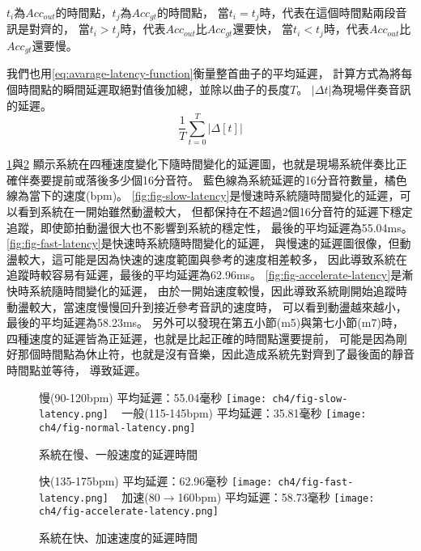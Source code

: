 \documentclass[class=NCU_thesis, crop=false]{standalone}
\begin{document}
$t_i$為$Acc_{out}$的時間點，$t_j$為$Acc_{gt}$的時間點，
當$t_i = t_j$時，代表在這個時間點兩段音訊是對齊的，
當$t_i > t_j$時，代表$Acc_{out}$比$Acc_{gt}$還要快，
當$t_i < t_j$時，代表$Acc_{out}$比$Acc_{gt}$還要慢。

我們也用\cref{eq:avarage-latency-function}衡量整首曲子的平均延遲，
計算方式為將每個時間點的瞬間延遲取絕對值後加總，並除以曲子的長度$T$。
$| \Delta t\vert $為現場伴奏音訊的延遲。
\begin{equation}
    \label{eq:avarage-latency-function}
    \frac{1}{T} \sum _{t=0}^{T} | \Delta [t] \vert 
\end{equation}

\cref{fig:fig-ch4-slow-and-normal-latency-results}與\cref{fig:fig-ch4-fast-and-accelerate-latency-results}
顯示系統在四種速度變化下隨時間變化的延遲圖，也就是現場系統伴奏比正確伴奏要提前或落後多少個16分音符。
藍色線為系統延遲的16分音符數量，橘色線為當下的速度(bpm)。
\cref{fig:fig-slow-latency}是慢速時系統隨時間變化的延遲，可以看到系統在一開始雖然動盪較大，
但都保持在不超過2個16分音符的延遲下穩定追蹤，即使節拍動盪很大也不影響到系統的穩定性，
最後的平均延遲為55.04ms。
\cref{fig:fig-fast-latency}是快速時系統隨時間變化的延遲，
與慢速的延遲圖很像，但動盪較大，這可能是因為快速的速度範圍與參考的速度相差較多，
因此導致系統在追蹤時較容易有延遲，最後的平均延遲為62.96ms。
\cref{fig:fig-accelerate-latency}是漸快時系統隨時間變化的延遲，
由於一開始速度較慢，因此導致系統剛開始追蹤時動盪較大，當速度慢慢回升到接近參考音訊的速度時，
可以看到動盪越來越小，最後的平均延遲為58.23ms。
另外可以發現在第五小節(m5)與第七小節(m7)時，四種速度的延遲皆為正延遲，也就是比起正確的時間點還要提前，
可能是因為剛好那個時間點為休止符，也就是沒有音樂，因此造成系統先對齊到了最後面的靜音時間點並等待，
導致延遲。

\begin{figure}[H]
    \centering
    \subcaptionbox
    {慢(90-120bpm) 平均延遲：55.04毫秒
    \label{fig:fig-slow-latency}}
    {\texttt{[image: ch4/fig-slow-latency.png]}}
    ~
    \subcaptionbox
    {一般(115-145bpm) 平均延遲：35.81毫秒
    \label{fig:fig-normal-latency}}
    {\texttt{[image: ch4/fig-normal-latency.png]}}
    \caption{系統在慢、一般速度的延遲時間}
    \label{fig:fig-ch4-slow-and-normal-latency-results}
\end{figure}

\begin{figure}[H]
    \centering
    \subcaptionbox
    {快(135-175bpm) 平均延遲：62.96毫秒
    \label{fig:fig-fast-latency}}
    {\texttt{[image: ch4/fig-fast-latency.png]}}
    ~
    \subcaptionbox
    {加速(80$ \rightarrow $160bpm) 平均延遲：58.73毫秒
    \label{fig:fig-accelerate-latency}}
    {\texttt{[image: ch4/fig-accelerate-latency.png]}}
    \caption{系統在快、加速速度的延遲時間}
    \label{fig:fig-ch4-fast-and-accelerate-latency-results}
\end{figure}
\end{document}
